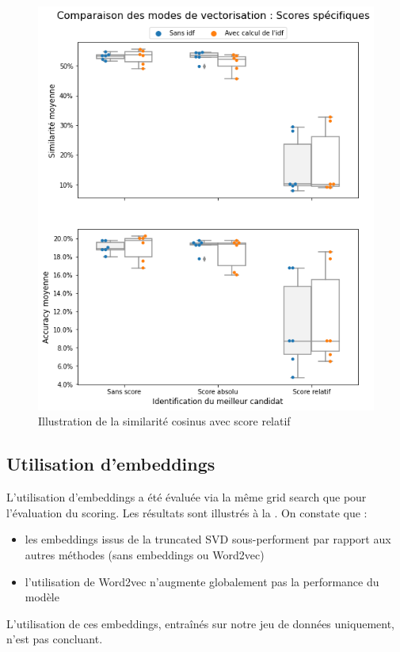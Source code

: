             \begin{figure}[htbp]
                \begin{center}
                \includegraphics[width=0.9\linewidth]{img/tuning_score.png}
                \end{center}
                \caption{Illustration de la similarité cosinus avec score relatif}
                \label{fig:tuning_score}
            \end{figure}

            \subsection{Utilisation d'embeddings}

            L'utilisation d'embeddings a été évaluée via la même grid search que pour l'évaluation du scoring.
            Les résultats sont illustrés à la .
            On constate que : 
            \begin{itemize}
                \item les embeddings issus de la truncated SVD sous-performent par rapport aux autres méthodes (sans embeddings ou Word2vec)
                \item l'utilisation de Word2vec n'augmente globalement pas la performance du modèle
            \end{itemize}
            L'utilisation de ces embeddings, entraînés sur notre jeu de données uniquement, n'est pas concluant.

